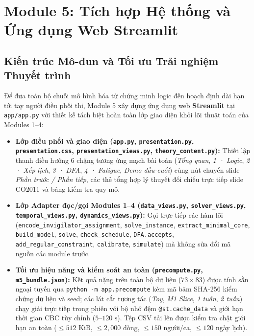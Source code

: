 \section{Module 5: Tích hợp Hệ thống và Ứng dụng Web Streamlit}
\label{sec:m5}

\subsection{Kiến trúc Mô-đun và Tối ưu Trải nghiệm Thuyết trình}
Để đưa toàn bộ chuỗi mô hình hóa từ chứng minh logic đến hoạch định dài hạn tới tay người điều phối thi, Module 5 xây dựng ứng dụng web \textbf{Streamlit} tại \texttt{app/app.py} với thiết kế tách biệt hoàn toàn lớp giao diện khỏi lõi thuật toán của Modules 1--4:
\begin{itemize}
    \item \textbf{Lớp điều phối và giao diện (\texttt{app.py}, \texttt{presentation.py}, \texttt{presentation.css}, \texttt{presentation\_\allowbreak views.py}, \texttt{theory\_\allowbreak content.py}):} Thiết lập thanh điều hướng $6$ chặng tương ứng mạch bài toán (\textit{Tổng quan}, \textit{1 · Logic}, \textit{2 · Xếp lịch}, \textit{3 · DFA}, \textit{4 · Fatigue}, \textit{Demo đầu-cuối}) cùng nút chuyển slide \textit{Phần trước / Phần tiếp}, các thẻ tổng hợp lý thuyết đối chiếu trực tiếp slide CO2011 và bảng kiểm tra quy mô.
    \item \textbf{Lớp Adapter đọc/gọi Modules 1--4 (\texttt{data\_\allowbreak views.py}, \texttt{solver\_\allowbreak views.py}, \texttt{temporal\_\allowbreak views.py}, \texttt{dynamics\_\allowbreak views.py}):} Gọi trực tiếp các hàm lõi (\texttt{encode\_\allowbreak invigilator\_\allowbreak assignment}, \texttt{solve\_\allowbreak instance}, \texttt{extract\_\allowbreak minimal\_\allowbreak core}, \texttt{build\_\allowbreak model}, \texttt{solve}, \texttt{check\_\allowbreak schedule}, \texttt{DFA.accepts}, \texttt{add\_\allowbreak regular\_\allowbreak constraint}, \texttt{calibrate}, \texttt{simulate}) mà không sửa đổi mã nguồn các module trước.
    \item \textbf{Tối ưu hiệu năng và kiểm soát an toàn (\texttt{precompute.py}, \texttt{m5\_\allowbreak bundle.json}):} Kết quả nặng trên toàn bộ dữ liệu ($73 \times 83$) được tính sẵn ngoại tuyến qua \texttt{python -m app.precompute} kèm mã băm SHA-256 kiểm chứng dữ liệu và seed; các lát cắt tương tác (\textit{Toy}, \textit{M1 Slice}, \textit{1 tuần}, \textit{2 tuần}) chạy giải trực tiếp trong phiên với bộ nhớ đệm \texttt{@st.cache\_\allowbreak data} và giới hạn thời gian CBC tùy chỉnh ($5$--$120\text{ s}$). Tệp CSV tải lên được kiểm tra chặt giới hạn an toàn ($\le 512\text{ KiB}$, $\le 2{,}000$ dòng, $\le 150$ người/ca, $\le 120$ ngày lịch).
\end{itemize}

